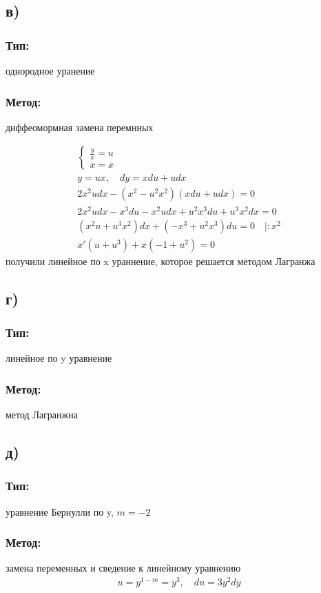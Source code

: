 \documentclass{article}
\begin{document}
\subsection*{в)}
\subsubsection*{Тип:} 
однородное уранение

\subsubsection*{Метод:}
диффеомормная замена перемнных

\begin{gather*}
\begin{cases}
\frac{y}{x}=u \\
x=x
\end{cases}\\
y=ux, \quad   dy=xdu+udx  \\
    2x^2udx-(x^2-u^2x^2)(xdu+udx)=0 \\
    2x^2udx-x^3du-x^2udx+u^2x^3du+u^3x^2dx=0 \\
    (x^2u+u^3x^2)dx+(-x^3+u^2x^3)du=0 \quad |:x^2 \\
    x'(u+u^3)+x(-1+u^2)=0
\end{gather*}
получили линейное по x ураннение, которое решается методом Лагранжа

\subsection*{г)}
\subsubsection*{Тип:} 
линейное по y уравнение 

\subsubsection*{Метод:}
метод Лагранжна

\subsection*{д)}
\subsubsection*{Тип:} 
уравнение Бернулли по y, $m=-2$

\subsubsection*{Метод:}
замена переменных и сведение к линейному уравнению
\begin{gather*}
    u=y^{1-m}=y^3, \quad   du=3y^2dy
\end{gather*}
\end{document}
